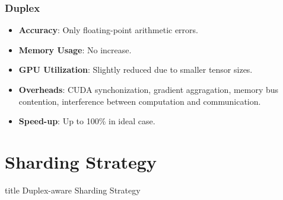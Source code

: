 \documentclass[12pt,aspectratio=169]{beamer}
\begin{document}
    \begin{frame}
        \frametitle{Duplex}

        \begin{itemize}
            \setlength{\itemsep}{.8em}
            \item \textbf{Accuracy}: Only floating-point arithmetic errors.
            \item \textbf{Memory Usage}: No increase.
            \item \textbf{GPU Utilization}: Slightly reduced due to smaller tensor sizes.
            \item \textbf{Overheads}: CUDA synchonization, gradient aggragation, memory bus contention, interference between computation and communication.
            \item \textbf{Speed-up}: Up to 100\% in ideal case.
        \end{itemize}
    \end{frame}


    \section*{Sharding Strategy}

    \begin{frame}
        \centering
        \begin{beamercolorbox}[sep=8pt,center,shadow=true,rounded=true]{title}
          Duplex-aware Sharding Strategy\par%
        \end{beamercolorbox}
    \end{frame}

\end{document}
